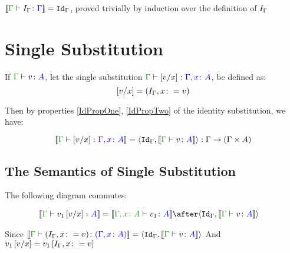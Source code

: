 \documentclass{report}
\begin{document}
\begin{property}[Denotation]\label{IdPropTwo}
    $\deno{\typerelation{\G}{I_{\G}}{\G}} = \idg$, proved trivially by induction over the definition of $I_{\G}$
\end{property}

\section{Single Substitution}

If $\typerelation{\G}{v}{A}$, let the single substitution $\typerelation{\G}{\ssub{x}{v}}{\gax}$, be defined as:
\begin{equation}
    \ssub{x}{v} = (I_{\G}, x\setto v)
\end{equation}

Then by properties \ref{IdPropOne}, \ref{IdPropTwo} of the identity substitution, we have:

\begin{equation}
    \deno{\gtyperelation{\ssub{x}{v}}{\gax}} = \pr{\idg}{\deno{\gtyperelation{v}{A}}}: \G\rightarrow(\G\times A)
\end{equation}

\subsection{The Semantics of Single Substitution}

The following diagram commutes:
\begin{framed}
    
    \begin{align*}
        \deno{\gtyperelation{v_1\ssub{x}{v}}{A}} &= \deno{\typerelation{\gax}{v_1}{A}}\after\pr{\idg}{\deno{\gtyperelation{v}{A}}}
    \end{align*}
    
    \centering
\end{framed}


Since $\deno{\gtyperelation{(I_{\G}, x\setto v)}{(\gax)}} = \pr{\idg}{\deno{\gtyperelation{v}{A}}}$
And $v_1\ssub{x}{v} = v_1\sub{I_{\G}, x\setto{v}}$
\end{document}
